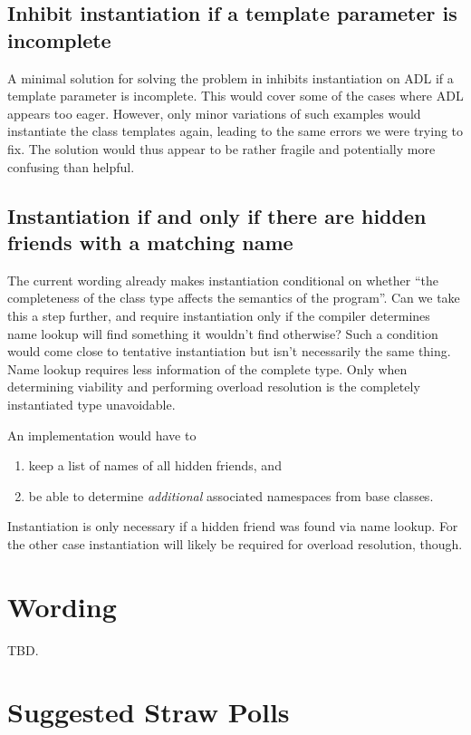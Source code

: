 \subsection{Inhibit instantiation if a template parameter is incomplete}

A minimal solution for solving the problem in  inhibits instantiation on ADL 
if a template parameter is incomplete. This would cover some of the cases where ADL 
appears too eager. However, only minor variations of such examples would instantiate the 
class templates again, leading to the same errors we were trying to fix. The solution 
would thus appear to be rather fragile and potentially more confusing than helpful.

\subsection{Instantiation if and only if there are hidden friends with a matching name}

The current wording already makes instantiation conditional on whether “the completeness 
of the class type affects the semantics of the program”. Can we take this a step further, 
and require instantiation only if the compiler determines name lookup will find something 
it wouldn't find otherwise? Such a condition would come close to tentative instantiation 
but isn't necessarily the same thing. Name lookup requires less information of the 
complete type. Only when determining viability and performing overload resolution is the 
completely instantiated type unavoidable.

An implementation would have to
\begin{enumerate}
\item keep a list of names of all hidden friends, and
\item be able to determine \emph{additional} associated namespaces from base classes.
\end{enumerate}
Instantiation is only necessary if a hidden friend was found via name lookup. For the 
other case instantiation will likely be required for overload resolution, though.

\section{Wording}

TBD.

\section{Suggested Straw Polls}

